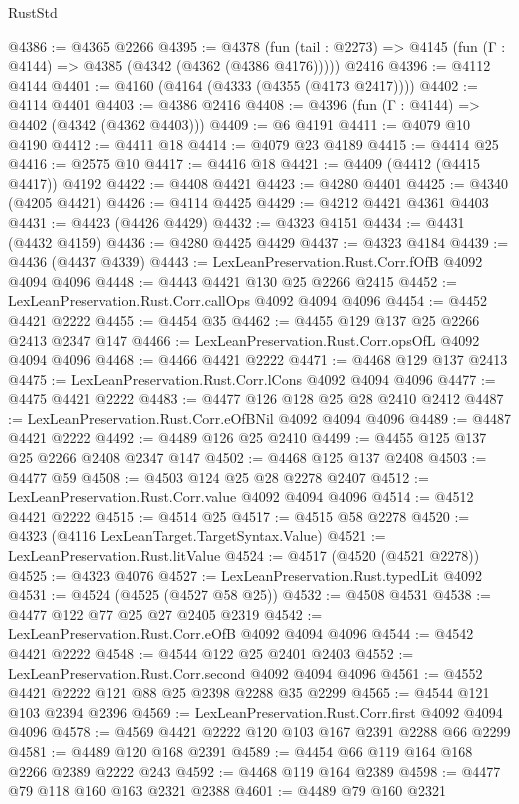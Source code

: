 \begin{lexlean}{RustStd}
\begin{coremodule}
@4386 := @4365 @2266
@4395 := @4378
    (fun (tail : @2273) => @4145 (fun (Γ : @4144) => @4385 (@4342 (@4362 (@4386 @4176)))))
    @2416
@4396 := @4112 @4144
@4401 := @4160 (@4164 (@4333 (@4355 (@4173 @2417))))
@4402 := @4114 @4401
@4403 := @4386 @2416
@4408 := @4396 (fun (Γ : @4144) => @4402 (@4342 (@4362 @4403)))
@4409 := @6 @4191
@4411 := @4079 @10 @4190
@4412 := @4411 @18
@4414 := @4079 @23 @4189
@4415 := @4414 @25
@4416 := @2575 @10
@4417 := @4416 @18
@4421 := @4409 (@4412 (@4415 @4417)) @4192
@4422 := @4408 @4421
@4423 := @4280 @4401
@4425 := @4340 (@4205 @4421)
@4426 := @4114 @4425
@4429 := @4212 @4421 @4361 @4403
@4431 := @4423 (@4426 @4429)
@4432 := @4323 @4151
@4434 := @4431 (@4432 @4159)
@4436 := @4280 @4425 @4429
@4437 := @4323 @4184
@4439 := @4436 (@4437 @4339)
@4443 := LexLeanPreservation.Rust.Corr.fOfB @4092 @4094 @4096
@4448 := @4443 @4421 @130 @25 @2266 @2415
@4452 := LexLeanPreservation.Rust.Corr.callOps @4092 @4094 @4096
@4454 := @4452 @4421 @2222
@4455 := @4454 @35
@4462 := @4455 @129 @137 @25 @2266 @2413 @2347 @147
@4466 := LexLeanPreservation.Rust.Corr.opsOfL @4092 @4094 @4096
@4468 := @4466 @4421 @2222
@4471 := @4468 @129 @137 @2413
@4475 := LexLeanPreservation.Rust.Corr.lCons @4092 @4094 @4096
@4477 := @4475 @4421 @2222
@4483 := @4477 @126 @128 @25 @28 @2410 @2412
@4487 := LexLeanPreservation.Rust.Corr.eOfBNil @4092 @4094 @4096
@4489 := @4487 @4421 @2222
@4492 := @4489 @126 @25 @2410
@4499 := @4455 @125 @137 @25 @2266 @2408 @2347 @147
@4502 := @4468 @125 @137 @2408
@4503 := @4477 @59
@4508 := @4503 @124 @25 @28 @2278 @2407
@4512 := LexLeanPreservation.Rust.Corr.value @4092 @4094 @4096
@4514 := @4512 @4421 @2222
@4515 := @4514 @25
@4517 := @4515 @58 @2278
@4520 := @4323 (@4116 LexLeanTarget.TargetSyntax.Value)
@4521 := LexLeanPreservation.Rust.litValue
@4524 := @4517 (@4520 (@4521 @2278))
@4525 := @4323 @4076
@4527 := LexLeanPreservation.Rust.typedLit @4092
@4531 := @4524 (@4525 (@4527 @58 @25))
@4532 := @4508 @4531
@4538 := @4477 @122 @77 @25 @27 @2405 @2319
@4542 := LexLeanPreservation.Rust.Corr.eOfB @4092 @4094 @4096
@4544 := @4542 @4421 @2222
@4548 := @4544 @122 @25 @2401 @2403
@4552 := LexLeanPreservation.Rust.Corr.second @4092 @4094 @4096
@4561 := @4552 @4421 @2222 @121 @88 @25 @2398 @2288 @35 @2299
@4565 := @4544 @121 @103 @2394 @2396
@4569 := LexLeanPreservation.Rust.Corr.first @4092 @4094 @4096
@4578 := @4569 @4421 @2222 @120 @103 @167 @2391 @2288 @66 @2299
@4581 := @4489 @120 @168 @2391
@4589 := @4454 @66 @119 @164 @168 @2266 @2389 @2222 @243
@4592 := @4468 @119 @164 @2389
@4598 := @4477 @79 @118 @160 @163 @2321 @2388
@4601 := @4489 @79 @160 @2321

\end{coremodule}
\end{lexlean}
